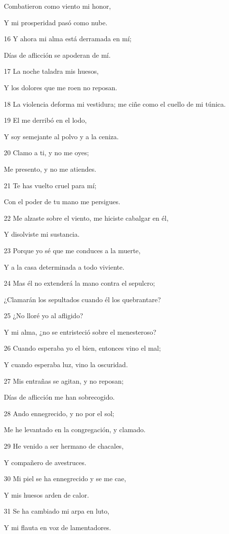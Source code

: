 \par Combatieron como viento mi honor,
\par Y mi prosperidad pasó como nube.
\par 16 Y ahora mi alma está derramada en mí;
\par Días de aflicción se apoderan de mí.
\par 17 La noche taladra mis huesos,
\par Y los dolores que me roen no reposan.
\par 18 La violencia deforma mi vestidura; me ciñe como el cuello de mi túnica.
\par 19 El me derribó en el lodo,
\par Y soy semejante al polvo y a la ceniza.
\par 20 Clamo a ti, y no me oyes;
\par Me presento, y no me atiendes.
\par 21 Te has vuelto cruel para mí;
\par Con el poder de tu mano me persigues.
\par 22 Me alzaste sobre el viento, me hiciste cabalgar en él,
\par Y disolviste mi sustancia.
\par 23 Porque yo sé que me conduces a la muerte,
\par Y a la casa determinada a todo viviente.
\par 24 Mas él no extenderá la mano contra el sepulcro;
\par ¿Clamarán los sepultados cuando él los quebrantare?
\par 25 ¿No lloré yo al afligido?
\par Y mi alma, ¿no se entristeció sobre el menesteroso?
\par 26 Cuando esperaba yo el bien, entonces vino el mal;
\par Y cuando esperaba luz, vino la oscuridad.
\par 27 Mis entrañas se agitan, y no reposan;
\par Días de aflicción me han sobrecogido.
\par 28 Ando ennegrecido, y no por el sol;
\par Me he levantado en la congregación, y clamado.
\par 29 He venido a ser hermano de chacales,
\par Y compañero de avestruces.
\par 30 Mi piel se ha ennegrecido y se me cae,
\par Y mis huesos arden de calor.
\par 31 Se ha cambiado mi arpa en luto,
\par Y mi flauta en voz de lamentadores.

